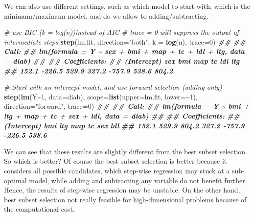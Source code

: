 \documentclass[
]{book}
\newenvironment{Shaded}{\begin{snugshade}}{\end{snugshade}}
\newcommand{\AttributeTok}[1]{\textcolor[rgb]{0.13,0.29,0.53}{#1}}
\newcommand{\CommentTok}[1]{\textcolor[rgb]{0.56,0.35,0.01}{\textit{#1}}}
\newcommand{\DecValTok}[1]{\textcolor[rgb]{0.00,0.00,0.81}{#1}}
\newcommand{\DocumentationTok}[1]{\textcolor[rgb]{0.56,0.35,0.01}{\textbf{\textit{#1}}}}
\newcommand{\FunctionTok}[1]{\textcolor[rgb]{0.13,0.29,0.53}{\textbf{#1}}}
\newcommand{\NormalTok}[1]{#1}
\newcommand{\SpecialCharTok}[1]{\textcolor[rgb]{0.81,0.36,0.00}{\textbf{#1}}}
\newcommand{\StringTok}[1]{\textcolor[rgb]{0.31,0.60,0.02}{#1}}
\theoremstyle{definition}
\theoremstyle{definition}
\theoremstyle{definition}
\theoremstyle{definition}
\theoremstyle{remark}
\begin{document}
We can also use different settings, such as which model to start with, which is the minimum/maximum model, and do we allow to adding/subtracting.

\begin{Shaded}
\begin{Highlighting}[]
    \CommentTok{\# use BIC (k = log(n))instead of AIC}
    \CommentTok{\# trace = 0 will suppress the output of intermediate steps }
    \FunctionTok{step}\NormalTok{(lm.fit, }\AttributeTok{direction=}\StringTok{"both"}\NormalTok{, }\AttributeTok{k =} \FunctionTok{log}\NormalTok{(n), }\AttributeTok{trace=}\DecValTok{0}\NormalTok{)}
\DocumentationTok{\#\# }
\DocumentationTok{\#\# Call:}
\DocumentationTok{\#\# lm(formula = Y \textasciitilde{} sex + bmi + map + tc + ldl + ltg, data = diab)}
\DocumentationTok{\#\# }
\DocumentationTok{\#\# Coefficients:}
\DocumentationTok{\#\# (Intercept)          sex          bmi          map           tc          ldl          ltg  }
\DocumentationTok{\#\#       152.1       {-}226.5        529.9        327.2       {-}757.9        538.6        804.2}

    \CommentTok{\# Start with an intercept model, and use forward selection (adding only)}
    \FunctionTok{step}\NormalTok{(}\FunctionTok{lm}\NormalTok{(Y}\SpecialCharTok{\textasciitilde{}}\DecValTok{1}\NormalTok{, }\AttributeTok{data=}\NormalTok{diab), }\AttributeTok{scope=}\FunctionTok{list}\NormalTok{(}\AttributeTok{upper=}\NormalTok{lm.fit, }\AttributeTok{lower=}\SpecialCharTok{\textasciitilde{}}\DecValTok{1}\NormalTok{), }
         \AttributeTok{direction=}\StringTok{"forward"}\NormalTok{, }\AttributeTok{trace=}\DecValTok{0}\NormalTok{)}
\DocumentationTok{\#\# }
\DocumentationTok{\#\# Call:}
\DocumentationTok{\#\# lm(formula = Y \textasciitilde{} bmi + ltg + map + tc + sex + ldl, data = diab)}
\DocumentationTok{\#\# }
\DocumentationTok{\#\# Coefficients:}
\DocumentationTok{\#\# (Intercept)          bmi          ltg          map           tc          sex          ldl  }
\DocumentationTok{\#\#       152.1        529.9        804.2        327.2       {-}757.9       {-}226.5        538.6}
\end{Highlighting}
\end{Shaded}

We can see that these results are slightly different from the best subset selection. So which is better? Of course the best subset selection is better because it considers all possible candidates, which step-wise regression may stuck at a sub-optimal model, while adding and subtracting any variable do not benefit further. Hence, the results of step-wise regression may be unstable. On the other hand, best subset selection not really feasible for high-dimensional problems because of the computational cost.
\end{document}
